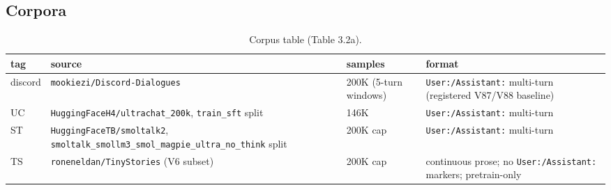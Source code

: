 \documentclass[11pt]{article}
\begin{document}
\subsection{Corpora}

\begin{table}[!t]
\centering
\small
\caption*{Corpus table (Table 3.2a).}
\begin{tabular}{lp{4.4cm}lp{6.4cm}}
\toprule
tag & source & samples & format \\
\midrule
discord & \texttt{mookiezi/Discord-Dialogues} & 200K (5-turn windows) & \texttt{User:/Assistant:} multi-turn (registered V87/V88 baseline) \\
UC & \texttt{HuggingFaceH4/ultrachat\_200k}, \texttt{train\_sft} split & 146K & \texttt{User:/Assistant:} multi-turn \\
ST & \texttt{HuggingFaceTB/smoltalk2}, \texttt{smoltalk\_\allowbreak smollm3\_\allowbreak smol\_\allowbreak magpie\_\allowbreak ultra\_\allowbreak no\_\allowbreak think} split & 200K cap & \texttt{User:/Assistant:} multi-turn \\
TS & \texttt{roneneldan/TinyStories} (V6 subset) & 200K cap & continuous prose; no \texttt{User:/Assistant:} markers; pretrain-only \\
\bottomrule
\end{tabular}
\end{table}
\end{document}
